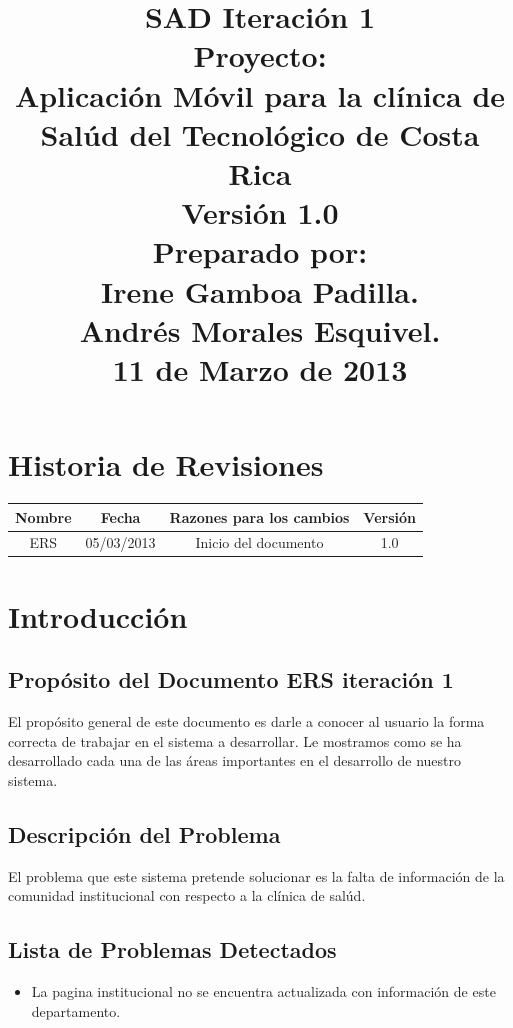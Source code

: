 \documentclass[12pt]{article}
\title{\begin{flushright}\textbf{SAD Iteraci\'on 1} \\[0.7in] 
		Proyecto: \\[0.2in]
		\textbf{Aplicaci\'on M\'ovil para la cl\'inica de Sal\'ud del Tecnol\'ogico de Costa Rica}\\[0.7in]
		Versi\'on 1.0 \\[0.7in]
		Preparado por: \\[0.2in]
		\textbf{Irene Gamboa Padilla.\\
		Andr\'es Morales Esquivel.} \\[0.7in]
		11 de Marzo de 2013
		\end{flushright}}
\author{}
\date{}
\begin{document}
\maketitle
\newpage
\renewcommand{\contentsname}{Tabla de Contenido}
{\footnotesize
	\tableofcontents
}
\section{Historia de Revisiones}

\begin{center}
	\begin{tabular}{|c|c|c|c|}
	\hline
		\textbf{Nombre} & \textbf{Fecha} & \textbf{Razones para los cambios} & \textbf{Versi\'on}\\
	\hline
		ERS & 05/03/2013 & Inicio del documento & 1.0\\
	\hline
	\end{tabular}
\end{center}

\newpage

\section{Introducci\'on}

\subsection{Prop\'osito del Documento ERS iteraci\'on 1}

El prop\'osito general de este documento es darle a conocer al usuario la forma correcta de trabajar en el sistema a desarrollar. Le mostramos como se ha desarrollado cada una de las \'areas importantes en el desarrollo de nuestro sistema.

\subsection{Descripci\'on del Problema}

El problema que este sistema pretende solucionar es la falta de informaci\'on de la comunidad institucional con respecto a la cl\'inica de sal\'ud.

\subsection{Lista de Problemas Detectados}
\begin{itemize}
	\item{La pagina institucional no se encuentra actualizada con informaci\'on de este departamento.}
\end{itemize}
\end{document}
